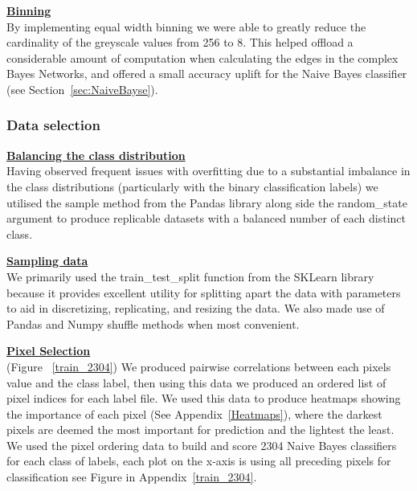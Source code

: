 \documentclass[11pt]{article}
\begin{document}
\textbf{\underline{Binning}}\\
By implementing equal width binning we were able to greatly reduce the cardinality of the greyscale values from 256 to 8. 
This helped offload a considerable amount of computation when calculating the edges in the complex Bayes Networks, and offered a small accuracy uplift for the Naive Bayes classifier (see Section~\ref{sec:NaiveBayse}).

\subsubsection{Data selection}
\textbf{\underline{Balancing the class distribution}}\\
Having observed frequent issues with overfitting due to a substantial imbalance in the class distributions (particularly with the binary classification labels) we utilised the sample method from the Pandas library along side the random\_state argument to produce replicable datasets with a balanced number of each distinct class.

\textbf{\underline{Sampling data}}\\
We primarily used the train\_test\_split function from the SKLearn library because it provides excellent utility for splitting apart the data with parameters to aid in discretizing, replicating, and resizing the data.
We also made use of Pandas and Numpy shuffle methods when most convenient.

\textbf{\underline{Pixel Selection}}\\
(Figure ~\ref{train_2304})
We produced pairwise correlations between each pixels value and the class label, then using this data we produced an ordered list of pixel indices for each label file. We used this data to produce heatmaps showing the importance of each pixel (See Appendix~\ref{Heatmaps}), where the darkest pixels are deemed the most important for prediction and the lightest the least.
We used the pixel ordering data to build and score 2304 Naive Bayes classifiers for each class of labels, each plot on the x-axis is using all preceding pixels for classification see Figure in Appendix~\ref{train_2304}.
\end{document}
